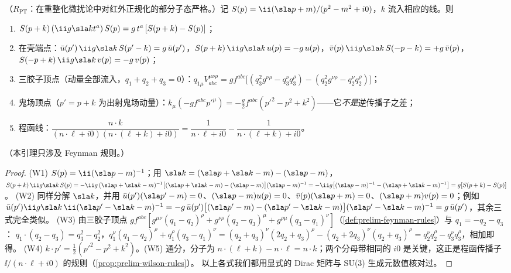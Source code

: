 \begin{lemma}\label{lem:method-ward-elementary}
（$R_{\mathrm{PT}}$：在重整化微扰论中对红外正规化的部分子态严格。）记 $S(p)=\ii(\sla p+m)/(p^2-m^2+i0)$，$k$ 流入相应的线。则
\begin{enumerate}[label=(W\arabic*),leftmargin=2.6em,itemsep=1pt,topsep=2pt]
\item $S(p+k)\,(\ii g\sla kt^a)\,S(p)=g\,t^a\,[S(p+k)-S(p)]$；
\item 在壳端点：$\bar u(p')\,\ii g\sla k\,S(p'-k)=g\,\bar u(p')$，$S(p+k)\,\ii g\sla k\,u(p)=-g\,u(p)$，$\bar v(p)\,\ii g\sla k\,S(-p-k)=+g\,\bar v(p)$，$S(-p+k)\,\ii g\sla k\,v(p)=-g\,v(p)$；
\item 三胶子顶点（动量全部流入，$q_1+q_2+q_3=0$）：$q_{1\mu}V^{\mu\nu\rho}_{abc}=gf^{abc}\bigl[(q_3^2g^{\nu\rho}-q_3^\nu q_3^\rho)-(q_2^2g^{\nu\rho}-q_2^\nu q_2^\rho)\bigr]$；
\item 鬼场顶点（$p'=p+k$ 为出射鬼场动量）：$k_\mu(-gf^{abc}p'^\mu)=-\frac g2f^{abc}(p'^2-p^2+k^2)$——它\emph{不是}逆传播子之差；
\item 程函线：$\dfrac{n\cdot k}{(n\cdot\ell+i0)(n\cdot(\ell+k)+i0)}=\dfrac1{n\cdot\ell+i0}-\dfrac1{n\cdot(\ell+k)+i0}$。
\end{enumerate}
（本引理只涉及 Feynman 规则。）
\end{lemma}

\begin{proof}
(W1) $S(p)=\ii(\sla p-m)^{-1}$；用 $\sla k=(\sla p+\sla k-m)-(\sla p-m)$，
$S(p+k)\,\ii g\sla k\,S(p)=-\ii g\,(\sla p+\sla k-m)^{-1}\bigl[(\sla p+\sla k-m)-(\sla p-m)\bigr](\sla p-m)^{-1}=-\ii g\bigl[(\sla p-m)^{-1}-(\sla p+\sla k-m)^{-1}\bigr]=g[S(p+k)-S(p)]$。
(W2) 同样分解 $\sla k$，并用 $\bar u(p')(\sla p'-m)=0$、$(\sla p-m)u(p)=0$、$\bar v(p)(\sla p+m)=0$、$(\sla p+m)v(p)=0$；例如
$\bar u(p')\ii g\sla k\,\ii(\sla p'-\sla k-m)^{-1}=-g\,\bar u(p')\bigl[(\sla p'-m)-(\sla p'-\sla k-m)\bigr](\sla p'-\sla k-m)^{-1}=g\,\bar u(p')$，其余三式完全类似。
(W3) 由三胶子顶点 $gf^{abc}[g^{\mu\nu}(q_1-q_2)^\rho+g^{\nu\rho}(q_2-q_3)^\mu+g^{\rho\mu}(q_3-q_1)^\nu]$（\cref{def:prelim-feynman-rules}）与 $q_1=-q_2-q_3$：
$q_1\cdot(q_2-q_3)=q_3^2-q_2^2$，$q_1^\nu(q_1-q_2)^\rho+q_1^\rho(q_3-q_1)^\nu=(q_2+q_3)^\nu(2q_2+q_3)^\rho-(q_2+2q_3)^\nu(q_2+q_3)^\rho=q_2^\nu q_2^\rho-q_3^\nu q_3^\rho$，相加即得。
(W4) $k\cdot p'=\frac12(p'^2-p^2+k^2)$。(W5) 通分，分子为 $n\cdot(\ell+k)-n\cdot\ell=n\cdot k$；两个分母带相同的 $i0$ 是关键，这正是程函传播子 $\ii/(n\cdot\ell+i0)$ 的规则（\cref{prop:prelim-wilson-rules}）。
以上各式我们都用显式的 Dirac 矩阵与 SU(3) 生成元数值核对过。%
\end{proof}

